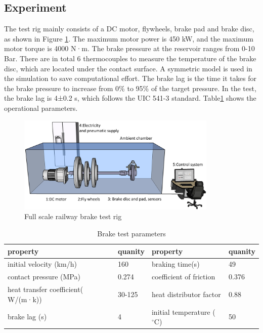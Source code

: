 \subsection*{Experiment}

The test rig mainly consists of a DC motor, flywheels, brake pad and brake disc, as shown in Figure \ref{fig:test rig}. The maximum motor power is 450 kW, and the maximum motor torque is 4000 N·m. The brake pressure at the reservoir ranges from 0-10 Bar. 
There are in total 6 thermocouples to measure the temperature of the brake disc, which are located under the contact surface. A symmetric model is used in the simulation to save computational effort. The brake lag is the time it takes for the brake pressure to increase from 0\% to 95\% of the target pressure. In the test, the brake lag is 4±0.2 s, which follows the UIC 541-3 standard. Table\ref{tab: operational parameters} shows the operational parameters.

\begin{figure}[h]
    \centering
    \includegraphics[width=0.85\textwidth]{book/chapters/zhang/graphics/test_rig.png}
    \caption{Full scale railway brake test rig}
    \label{fig:test rig}
\end{figure}

\begin{table}[h]
    \centering
    \begin{tabular}{llll} %
        \toprule
        \textbf{property} & \textbf{quanity} & \textbf{property} & \textbf{quanity}\\ %
        \midrule
        initial velocity (km/h)             & 160       &braking time(s)          & 49 \\
        contact pressure (MPa)              & 0.274      &coefficient of friction  & 0.376 \\
        heat transfer coefficient( W/(m·k)) & 30-125    &heat distributor factor  & 0.88 \\
        brake lag (s)                       & 4         &initial temperature ($^\circ\text{C}$) & 50\\
       
        \bottomrule
    \end{tabular}
    \caption{Brake test parameters}
    \label{tab: operational parameters}
\end{table}

